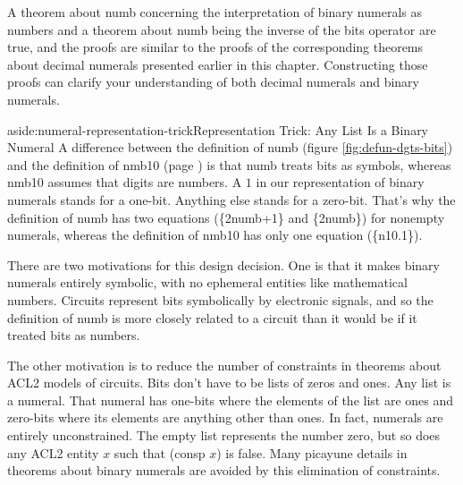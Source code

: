 A theorem about \textsf{numb} concerning the interpretation of
binary numerals as numbers and a theorem about \textsf{numb}
being the inverse of the \textsf{bits} operator are true,
and the proofs are similar to the proofs of the corresponding
theorems about decimal numerals presented earlier in this chapter.
Constructing those proofs can
clarify your understanding of both decimal numerals
and binary numerals.

\begin{aside}{aside:numeral-representation-trick}{Representation Trick: Any List Is a Binary Numeral}
A difference between the definition of \textsf{numb} (figure \ref{fig:defun-dgts-bits})
and the definition of \textsf{nmb10} (page \pageref{nmb10-defun})
is that \textsf{numb} treats bits as symbols,
whereas \textsf{nmb10} assumes that digits are numbers.
A $1$ in our representation of binary numerals
stands for a one-bit. Anything else stands for a zero-bit.
That's why the definition of \textsf{numb} has two equations (\{2numb+1\} and \{2numb\})
for nonempty numerals,
whereas the definition of \textsf{nmb10} has only one equation (\{n10.1\}).

There are two motivations for this design decision.
One is that it makes binary numerals entirely symbolic,
with no ephemeral entities like mathematical numbers.
Circuits represent bits symbolically by electronic signals,
and so the definition of \textsf{numb} is more closely
related to a circuit than it would be if it treated
bits as numbers.

The other motivation is to reduce the number of constraints
in theorems about ACL2 models of circuits.
Bits don't have to be lists of zeros and ones.
Any list is a numeral.
That numeral has one-bits where the elements of the list are ones
and zero-bits where its elements are anything other than ones.
In fact, numerals are entirely unconstrained.
The empty list represents the number zero,
but so does any ACL2 entity $x$ such that \textsf{(consp $x$)} is false.
Many picayune details in theorems about binary numerals
are avoided by this elimination of constraints.
\end{aside}

